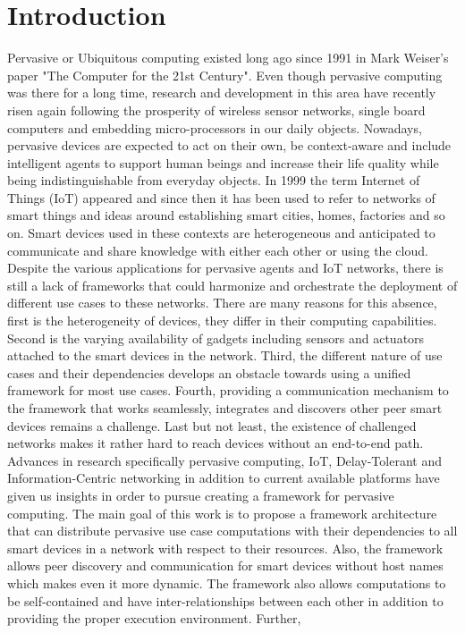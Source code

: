 
\chapter{Introduction}\label{chapter:introduction}
 Pervasive or Ubiquitous computing existed long ago since 1991 in Mark Weiser's paper "The Computer for the 21st Century". Even though pervasive computing  was there for a long time, research and development in this area have recently risen again following the  prosperity of wireless sensor networks, single board computers and embedding micro-processors in our daily objects. Nowadays, pervasive devices are expected to act on their own, be context-aware and include intelligent agents to support human beings and increase their life quality while being indistinguishable from  everyday objects. In 1999 the term Internet of Things (IoT) appeared and since then it has been used to refer to networks of smart things and  ideas around establishing smart cities, homes, factories and so on. Smart devices used in these contexts are heterogeneous and  anticipated to communicate and share knowledge with either each other or using the cloud. Despite the various applications for pervasive agents and IoT networks, there is still a lack of frameworks that could harmonize and orchestrate the deployment of different use cases to these networks. There are many reasons for this absence, first is the heterogeneity of devices, they differ in their computing capabilities. Second is the varying  availability of gadgets including sensors and actuators attached to the smart devices in the network. Third, the different nature of use cases and their dependencies develops an obstacle towards using a unified framework for most use cases. Fourth, providing a communication mechanism to the framework that works seamlessly, integrates and discovers other peer smart devices remains a challenge. Last but not least, the existence of challenged networks makes it rather hard to reach devices without an end-to-end path. Advances in research specifically  pervasive computing, IoT, Delay-Tolerant and Information-Centric networking in addition to current available platforms have given us insights in order to pursue creating a framework for pervasive computing. The main goal of this work is to propose a framework architecture that can distribute  pervasive use case computations with their dependencies to all smart devices in a network with respect to their resources. Also, the framework allows peer discovery and communication for  smart devices without host names which makes even it more dynamic. The framework also allows computations to  be self-contained and have inter-relationships between each other in addition to providing the proper execution environment. Further, 